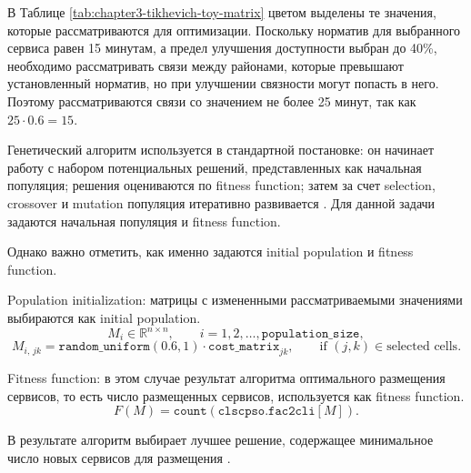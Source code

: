 В Таблице \ref{tab:chapter3-tikhevich-toy-matrix} цветом выделены те значения, которые рассматриваются для оптимизации. Поскольку норматив для выбранного сервиса равен 15 минутам, а предел улучшения доступности выбран до 40\%, необходимо рассматривать связи между районами, которые превышают установленный норматив, но при улучшении связности могут попасть в него. Поэтому рассматриваются связи со значением не более 25 минут, так как \(25\cdot 0.6=15\).

Генетический алгоритм используется в стандартной постановке: он начинает работу с набором потенциальных решений, представленных как начальная популяция; решения оцениваются по fitness function; затем за счет selection, crossover и mutation популяция итеративно развивается \cite{lambora2019geneticAlgorithm,mirjalili2019geneticAlgorithm,kontsevik2024connectivityPlacement}. Для данной задачи задаются начальная популяция и fitness function.

Однако важно отметить, как именно задаются initial population и fitness function.

Population initialization:
матрицы с измененными рассматриваемыми значениями выбираются как initial population.
\[
M_i \in \mathbb{R}^{n\times n},
\qquad i=1,2,\dots,\mathtt{population\_size},
\]
\[
M_{i,\,jk}=\mathtt{random\_uniform}(0.6,1)\cdot \mathtt{cost\_matrix}_{jk},
\qquad \text{if } (j,k)\in\text{selected cells}.
\]

Fitness function:
в этом случае результат алгоритма оптимального размещения сервисов, то есть число размещенных сервисов, используется как fitness function.
\[
F(M)=\texttt{count}(\texttt{clscpso.fac2cli}[M]).
\]

В результате алгоритм выбирает лучшее решение, содержащее минимальное число новых сервисов для размещения \cite{kontsevik2024connectivityPlacement}.

